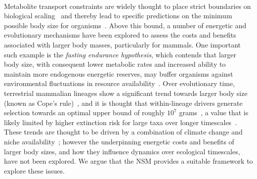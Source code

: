 \documentclass{pnastwo}
\begin{document}
\begin{article}
 \\
Metabolite transport constraints are widely thought to place strict boundaries on biological scaling~\cite{Brown:1993p708,West:1997cg,Brown:2004wq} and thereby lead to specific predictions on the minimum possible body size for organisms~\cite{West:2002ud}.  
Above this bound, a number of energetic and evolutionary mechanisms have been explored to assess the costs and benefits associated with larger body masses, particularly for mammals.  
One important such example is the \emph{fasting endurance hypothesis}, which contends that larger body size, with consequent lower metabolic rates and increased ability to maintain more endogenous energetic reserves, may buffer organisms against environmental fluctuations in resource availability~\cite{Millar:1990p923}. 
Over evolutionary time, terrestrial mammalian lineages show a significant trend towards larger body size (known as Cope's rule)~\cite{Alroy:1998p1594,Clauset:2009fh,Smith:2010p3442,Saarinen:2014br}, and it is thought that within-lineage drivers generate selection towards an optimal upper bound of roughly $10^7$ grams~\cite{Alroy:1998p1594}, a value that is likely limited by higher extinction risk for large taxa over longer timescales~\cite{Clauset:2009fh}.  
These trends are thought to be driven by a combination of climate change and niche availability~\cite{Saarinen:2014br}; however the underpinning energetic costs and benefits of larger body sizes, and how they influence dynamics over ecological timescales, have not been explored.  
We argue that the NSM provides a suitable framework to explore these issues.


\end{article}
\end{document}
